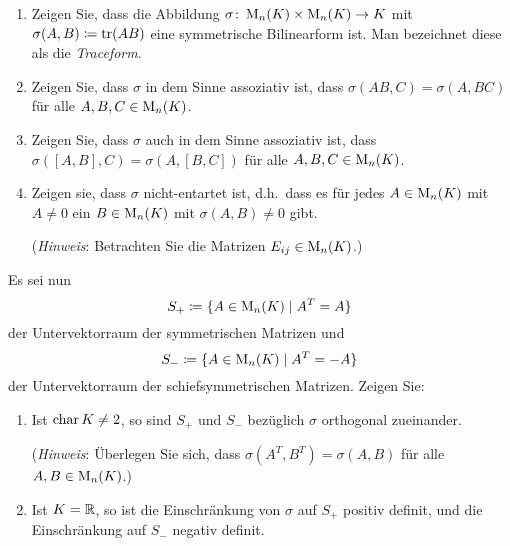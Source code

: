 \begin{question}[subtitle = Die Traceform]{3}
  \begin{enumerate}[leftmargin=*]
    \item
      Zeigen Sie, dass die Abbildung $\sigma \colon \operatorname{M}_n(K) \times \operatorname{M}_n(K) \to K$ mit $\sigma(A, B) \coloneqq \operatorname{tr}(AB)$ eine symmetrische Bilinearform ist.
      Man bezeichnet diese als die \emph{Traceform}.
    \item
      Zeigen Sie, dass $\sigma$ in dem Sinne assoziativ ist, dass $\sigma(AB, C) = \sigma(A, BC)$ für alle $A, B, C \in \operatorname{M}_n(K)$.
    \item
      Zeigen Sie, dass $\sigma$ auch in dem Sinne assoziativ ist, dass $\sigma([A,B],C) = \sigma(A,[B,C])$ für alle $A, B, C \in \operatorname{M}_n(K)$.
    \item
      Zeigen sie, dass $\sigma$ nicht-entartet ist, d.h.\ dass es für jedes $A \in \operatorname{M}_n(K)$ mit $A \neq 0$ ein $B \in \operatorname{M}_n(K)$ mit $\sigma(A, B) \neq 0$ gibt.
      
      (\emph{Hinweis}:
       Betrachten Sie die Matrizen $E_{ij} \in \operatorname{M}_n(K)$.)
  \end{enumerate}
  Es sei nun
  \[
    S_+ \coloneqq \{ A \in \operatorname{M}_n(K) \mid A^T = A \}
  \]
  der Untervektorraum der symmetrischen Matrizen und
  \[
    S_- \coloneqq \{ A \in \operatorname{M}_n(K) \mid A^T = -A \}
  \]
  der Untervektorraum der schiefsymmetrischen Matrizen.
  Zeigen Sie:
  \begin{enumerate}[leftmargin=*, resume]
    \item
      Ist $\operatorname{char} K \neq 2$, so sind $S_+$ und $S_-$ bezüglich $\sigma$ orthogonal zueinander.
      
      (\emph{Hinweis}:
       Überlegen Sie sich, dass $\sigma(A^T, B^T) = \sigma(A, B)$ für alle $A, B \in \operatorname{M}_n(K)$.)
    \item
      Ist $K = \mathbb{R}$, so ist die Einschränkung von $\sigma$ auf $S_+$ positiv definit, und die Einschränkung auf $S_-$ negativ definit.
  \end{enumerate}
\end{question}


